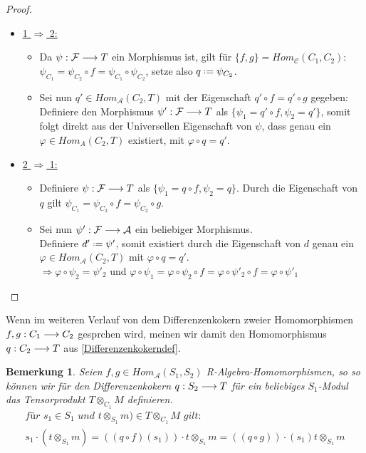 \documentclass[10pt,a4paper]{report}
\newcounter{Aussage}[chapter]
\newtheorem{bem}[Aussage]{Bemerkung}
\newcommand{\functionfront}[3]{\nolinebreak{#1:#2 \longrightarrow #3}}
\newcommand{\tensor}[3]{#1 \otimes_{#2} #3}
\newcommand*{\defeq}{\mathrel{\vcenter{\baselineskip0.5ex \lineskiplimit0pt
                     \hbox{\scriptsize.}\hbox{\scriptsize.}}}%
                     =}
\begin{document}
\begin{proof}
\ \\
\begin{itemize}
\item \underline{1 $\Rightarrow$ 2:}
\begin{itemize}
\item[] Da $\functionfront{\psi}{\mathcal{F}}{T}$ ein Morphismus ist, gilt für $\lbrace f,g \rbrace = Hom_{\mathcal{C}}(C_1,C_2)$:\\ $\psi_{C_1} = \psi_{C_2} \circ f = \psi_{C_1} \circ \psi_{C_2}$, setze also 
 $q  \defeq \psi_{C_2}$.
\item[] Sei nun $q' \in Hom_{\mathcal{A}}(C_2,T)$ mit der Eigenschaft $q' \circ f = q' \circ g$ gegeben:\\
 Definiere den Morphismus $\functionfront{\psi '}{\mathcal{F}}{T}$ als $\lbrace \psi_1 = q' \circ f , \psi_2 = q' \rbrace$,  somit folgt direkt aus der Universellen Eigenschaft von $\psi$, dass genau ein $\varphi \in Hom_{A}(C_2,T)$ existiert, mit $ \varphi \circ q = q '$.
\end{itemize}
\item \underline{2 $\Rightarrow$ 1:}
\begin{itemize}
\item[] Definiere $\functionfront{\psi }{\mathcal{F}}{T}$ als $\lbrace \psi_1 = q \circ f , \psi_2 = q \rbrace$.
Durch die Eigenschaft von $q$ gilt $\psi_{C_1} = \psi_{C_2} \circ f = \psi_{C_2} \circ g$.
\item[] Sei nun $\functionfront{\psi '}{\mathcal{F}}{\mathcal{A}}$ ein beliebiger Morphismus.\\
Definiere $d' \defeq \psi '$, somit existiert durch die Eigenschaft von $d$ genau ein $\varphi \in Hom_{\mathcal{A}}(C_2,T)$ mit $\varphi \circ q = q'$. \\
$\Rightarrow \varphi \circ \psi_2 = \psi '_2$ 
und $\varphi \circ \psi_1 = \varphi \circ \psi_2 \circ f = \varphi \circ \psi '_2 \circ f = \varphi \circ \psi '_1$
\end{itemize}
\end{itemize}
\end{proof}

Wenn im weiteren Verlauf von dem Differenzenkokern zweier Homomorphismen $\functionfront{f,g}{C_1}{C_2}$ gesprchen wird, meinen wir damit den Homomorphismus $\functionfront{q}{C_2}{T}$ aus \cref{Differenzenkokerndef}.

\begin{bem}
Seien $f,g \in Hom_{\mathcal{A}}(S_1,S_2)$ R-Algebra-Homomorphismen, so so können wir für den Differenzenkokern $\functionfront{q}{S_2}{T}$ für ein beliebiges $S_1$-Modul das Tensorprodukt $\tensor{T}{C_1}{M}$ definieren.
\begin{gather*}
\textit{für } s_1 \in S_1 \textit{ und } \tensor{t}{S_1}{m}) \in \tensor{T}{C_1}{M} \textit{ gilt: }\\
s_1 \cdot (\tensor{t}{S_1}{m}) = \tensor{((q \circ f)(s_1)) \cdot t}{S_1}{m} = \tensor{((q \circ g)) \cdot (s_1)t}{S_1}{m}
\end{gather*}
\end{bem}
\end{document}
